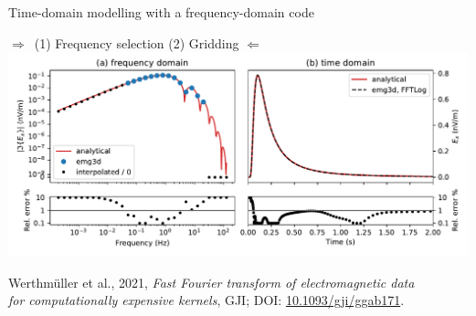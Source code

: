 \documentclass[xcolor=svgnames, usepdftitle=false, aspectratio=169]{beamer}
\title{\vspace{2.5cm}\color{white}{\ttitle}}
\subtitle{\color{white}{using frequency- and Laplace-domain computations}}
\date{\color{white}{20 October 2021}}
\author{\vspace{-.3cm}\color{white}{Dieter Werthmüller and Evert Slob, TU Delft}}
\institute{}
\newcommand{\bdra}{\ensuremath{\boldsymbol \Rightarrow }~}
\newcommand{\bdla}{\ensuremath{\boldsymbol \Leftarrow }~}
\begin{document}

\maketitle %

\begin{frame}
  {Time-domain modelling with a frequency-domain code}
  \centering

  \bdra \quad (1) Frequency selection \quad (2) Gridding \quad \bdla\\[.5cm]

  \includegraphics[width=.8\textwidth]{fullspace}


  {\raggedright\small
  Werthmüller et al., 2021, \emph{Fast Fourier transform of electromagnetic
  data\\for computationally expensive kernels}, GJI; DOI:
  \href{https://doi.org/10.1093/gji/ggab171}{10.1093/gji/ggab171}.\\
  }


\end{frame}
\end{document}
